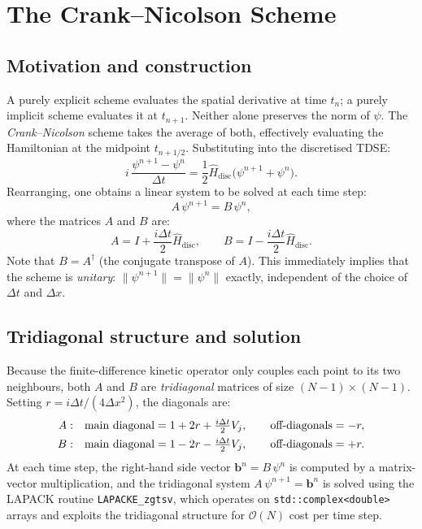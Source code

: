 \documentclass[a4paper,12pt]{article}
\newcommand{\dt}{\Delta t}
\newcommand{\dx}{\Delta x}
\begin{document}
\section{The Crank--Nicolson Scheme}

\subsection{Motivation and construction}

A purely explicit scheme evaluates the spatial derivative at time $t_n$;
a purely implicit scheme evaluates it at $t_{n+1}$.
Neither alone preserves the norm of $\psi$.
The \emph{Crank--Nicolson} scheme takes the average of both, effectively
evaluating the Hamiltonian at the midpoint $t_{n+1/2}$.
Substituting into the discretised TDSE:
\begin{equation}
  i\,\frac{\psi^{n+1} - \psi^n}{\dt}
  = \frac{1}{2}\hat{H}_\mathrm{disc}\bigl(\psi^{n+1} + \psi^n\bigr).
\end{equation}
Rearranging, one obtains a linear system to be solved at each time step:
\begin{equation}
  A\,\psi^{n+1} = B\,\psi^n,
\end{equation}
where the matrices $A$ and $B$ are:
\begin{equation}
  A = I + \frac{i\dt}{2}\hat{H}_\mathrm{disc}, \qquad
  B = I - \frac{i\dt}{2}\hat{H}_\mathrm{disc}.
\end{equation}
Note that $B = A^\dagger$ (the conjugate transpose of $A$).
This immediately implies that the scheme is \emph{unitary}:
$\|\psi^{n+1}\| = \|\psi^n\|$ exactly, independent of the choice of $\dt$
and $\dx$.

\subsection{Tridiagonal structure and solution}

Because the finite-difference kinetic operator only couples each point to its
two neighbours, both $A$ and $B$ are \emph{tridiagonal} matrices of size
$(N-1)\times(N-1)$.
Setting $r = i\dt/(4\dx^2)$, the diagonals are:
\begin{align}
  A:\quad & \text{main diagonal} = 1 + 2r + \tfrac{i\dt}{2}V_j, \qquad
            \text{off-diagonals} = -r, \notag\\
  B:\quad & \text{main diagonal} = 1 - 2r - \tfrac{i\dt}{2}V_j, \qquad
            \text{off-diagonals} = +r. \notag
\end{align}
At each time step, the right-hand side vector
$\mathbf{b}^n = B\,\psi^n$ is computed by a matrix-vector multiplication,
and the tridiagonal system $A\,\psi^{n+1} = \mathbf{b}^n$ is solved using the
LAPACK routine \texttt{LAPACKE\_zgtsv}, which operates on
\texttt{std::complex<double>} arrays and exploits the tridiagonal structure
for $\mathcal{O}(N)$ cost per time step.
\end{document}
